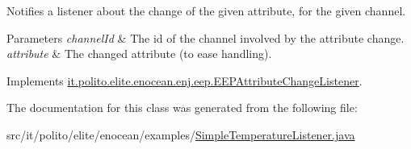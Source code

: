 Notifies a listener about the change of the given attribute, for the given channel. 
\begin{DoxyParams}{Parameters}
{\em channel\+Id} & The id of the channel involved by the attribute change. \\
\hline
{\em attribute} & The changed attribute (to ease handling). \\
\hline
\end{DoxyParams}


Implements \hyperlink{interfaceit_1_1polito_1_1elite_1_1enocean_1_1enj_1_1eep_1_1_e_e_p_attribute_change_listener_a8ed543f4de048252dfd133116d488382}{it.\+polito.\+elite.\+enocean.\+enj.\+eep.\+E\+E\+P\+Attribute\+Change\+Listener}.



The documentation for this class was generated from the following file\+:\begin{DoxyCompactItemize}
\item 
src/it/polito/elite/enocean/examples/\hyperlink{_simple_temperature_listener_8java}{Simple\+Temperature\+Listener.\+java}\end{DoxyCompactItemize}
